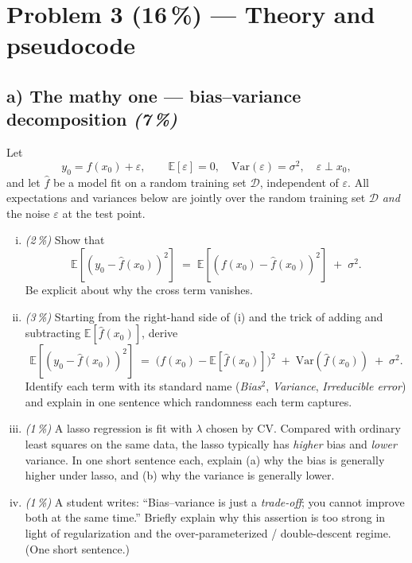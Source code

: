 \documentclass[11pt,a4paper]{article}
\newcommand{\points}[1]{\textbf{(#1\,\%)}}
\newcommand{\subpoints}[1]{\textit{(#1\,\%)}}
\begin{document}
\section*{Problem 3 \points{16} --- Theory and pseudocode}

\subsection*{a) The mathy one --- bias--variance decomposition \subpoints{7}}

Let
$$y_0 = f(x_0) + \varepsilon, \qquad \mathbb{E}[\varepsilon] = 0, \quad \mathrm{Var}(\varepsilon) = \sigma^2, \quad \varepsilon \perp x_0,$$
and let $\hat f$ be a model fit on a random training set $\mathcal D$, independent of $\varepsilon$. All expectations and variances below are jointly over the random training set $\mathcal D$ \emph{and} the noise $\varepsilon$ at the test point.

\begin{enumerate}[(i)]
  \item \subpoints{2} Show that
  $$\mathbb{E}\!\left[(y_0 - \hat f(x_0))^2\right] \;=\; \mathbb{E}\!\left[(f(x_0) - \hat f(x_0))^2\right] \;+\; \sigma^2.$$
  Be explicit about why the cross term vanishes.
  \item \subpoints{3} Starting from the right-hand side of (i) and the trick of adding and subtracting $\mathbb{E}[\hat f(x_0)]$, derive
  $$\boxed{\;\mathbb{E}\!\left[(y_0 - \hat f(x_0))^2\right] \;=\; \bigl(f(x_0) - \mathbb{E}[\hat f(x_0)]\bigr)^{\!2} \;+\; \mathrm{Var}\!\left(\hat f(x_0)\right) \;+\; \sigma^2.\;}$$
  Identify each term with its standard name (\emph{Bias}$^2$, \emph{Variance}, \emph{Irreducible error}) and explain in one sentence which randomness each term captures.
  \item \subpoints{1} A lasso regression is fit with $\lambda$ chosen by CV. Compared with ordinary least squares on the same data, the lasso typically has \emph{higher} bias and \emph{lower} variance. In one short sentence each, explain (a) why the bias is generally higher under lasso, and (b) why the variance is generally lower.
  \item \subpoints{1} A student writes: ``Bias--variance is just a \emph{trade-off}; you cannot improve both at the same time.'' Briefly explain why this assertion is too strong in light of regularization and the over-parameterized / double-descent regime. (One short sentence.)
\end{enumerate}
\end{document}
